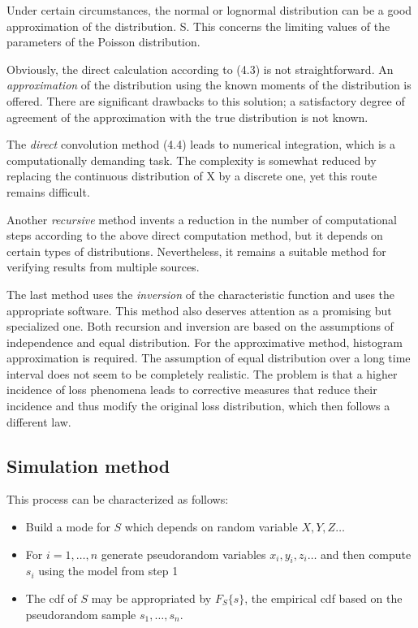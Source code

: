 \documentclass{article}
\begin{document}
Under certain circumstances, the normal or lognormal distribution can be a good approximation of the distribution. S. This concerns the limiting values of the parameters of the Poisson distribution.

Obviously, the direct calculation according to (4.3) is not straightforward. An \emph{approximation} of the distribution using the known moments of the distribution is offered. There are significant drawbacks to this solution; a satisfactory degree of agreement of the approximation with the true distribution is not known.

The \emph{direct} convolution method (4.4) leads to numerical integration, which is a computationally demanding task. The complexity is somewhat reduced by replacing the continuous distribution of X by a discrete one, yet this route remains difficult.

Another \emph{recursive} method invents a reduction in the number of computational steps according to the above direct computation method, but it depends on certain types of distributions. Nevertheless, it remains a suitable method for verifying results from multiple sources.

The last method uses the \emph{inversion} of the characteristic function and uses the appropriate software. This method also deserves attention as a promising but specialized one. Both recursion and inversion are based on the assumptions of independence and equal distribution. For the approximative method, histogram approximation is required. The assumption of equal distribution over a long time interval does not seem to be completely realistic. The problem is that a higher incidence of loss phenomena leads to corrective measures that reduce their incidence and thus modify the original loss distribution, which then follows a different law.


\subsection{Simulation method}

This process can be characterized as follows:


\begin{itemize}
  \item Build a mode for $S$ which depends on random variable $X, Y, Z\ldots$
  \item For $i = 1,\ldots,n$ generate pseudorandom variables $x_i,y_i,z_i\ldots$ and then compute $s_i$ using the model from step 1
  \item The cdf of $S$ may be appropriated by $F_S\{s\}$, the empirical cdf based on the pseudorandom sample $s_1,\ldots,s_n$.
\end{itemize}
\end{document}
